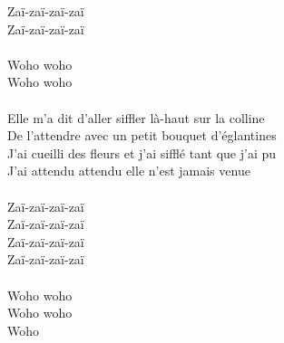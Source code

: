 Zaï-zaï-zaï-zaï\\
Zaï-zaï-zaï-zaï\\\\
Woho woho\\
Woho woho\\\\
Elle m'a dit d'aller siffler là-haut sur la colline\\
De l'attendre avec un petit bouquet d'églantines\\
J'ai cueilli des fleurs et j'ai sifflé tant que j'ai pu\\
J'ai attendu attendu elle n'est jamais venue\\\\
Zaï-zaï-zaï-zaï\\
Zaï-zaï-zaï-zaï\\
Zaï-zaï-zaï-zaï\\
Zaï-zaï-zaï-zaï\\\\
Woho woho\\
Woho woho\\
Woho\\
